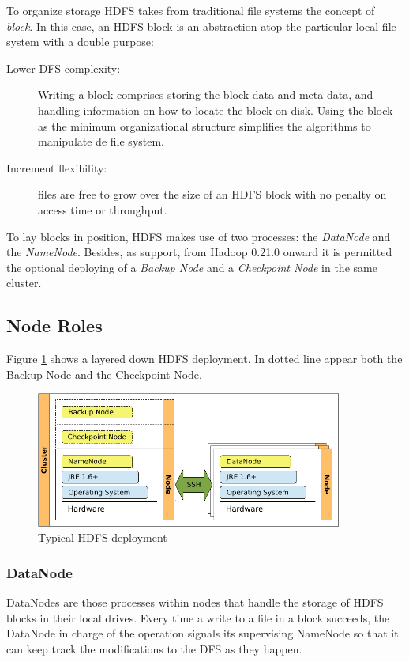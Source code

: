 To organize storage HDFS takes from traditional file systems the concept of \emph{block}. In this case, an HDFS block is an abstraction atop the particular local file system with a double purpose:

\begin{description}
 \item[Lower DFS complexity:] Writing a block comprises storing the block data and meta-data, and handling information on how to locate the block on disk. Using the block as the minimum organizational structure simplifies the algorithms to manipulate de file system.
 \item[Increment flexibility:] files are free to grow over the size of an HDFS block with no penalty on access time or throughput.
\end{description}

To lay blocks in position, HDFS makes use of two processes: the \emph{DataNode} and the \emph{NameNode}. Besides, as support, from Hadoop 0.21.0 onward it is permitted the optional deploying of a \emph{Backup Node} and a \emph{Checkpoint Node} in the same cluster.

\subsection{Node Roles}\label{subsec:rolesnodos}
\noindent Figure \ref{fig:desplieguehdfs} shows a layered down HDFS deployment. In dotted line appear both the Backup Node and the Checkpoint Node.

\begin{figure}[tbp]
\begin{center}
\includegraphics[width=0.9\textwidth]{imagenes/017.pdf}
 \caption{Typical HDFS deployment}
\label{fig:desplieguehdfs}
\end{center}
\end{figure}

\subsubsection{DataNode}\label{subsubsec:datanode}
\noindent DataNodes are those processes within nodes that handle the storage of HDFS blocks in their local drives. Every time a write to a file in a block succeeds, the DataNode in charge of the operation signals its supervising NameNode so that it can keep track the modifications to the DFS as they happen.

